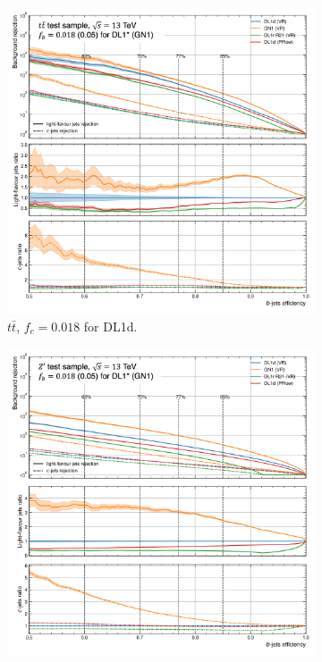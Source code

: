 \begin{figure}[h!]
  \centering
  \begin{subfigure}[t]{0.48\textwidth}
    \centering
    \includegraphics[width=\textwidth]{Images/FTAG/VRDL1d/ROC/ttb.png}
    \caption{$t\bar{t}$, $f_c = 0.018$ for DL1d.}
    \label{fig:dl1dVRROCtt}
  \end{subfigure}
  \begin{subfigure}[t]{0.48\textwidth}
    \centering
    \includegraphics[width=\textwidth]{Images/FTAG/VRDL1d/ROC/zpb.png}

\end{subfigure}
\end{figure}
